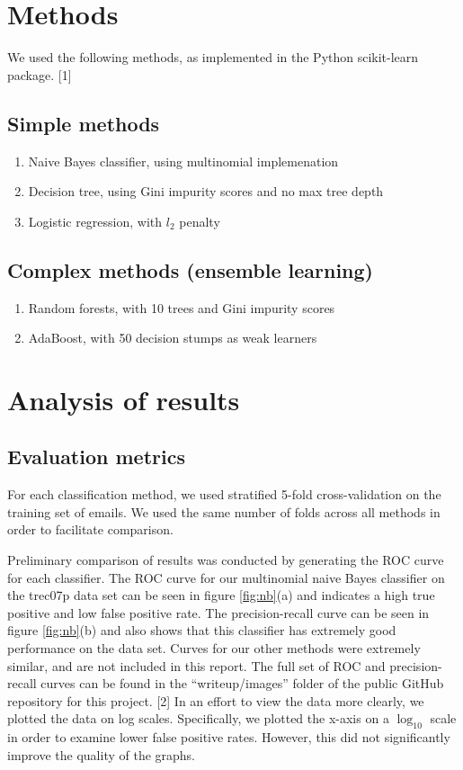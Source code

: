 \documentclass{article} %
\begin{document}
\section{Methods}
We used the following methods, as implemented in the Python scikit-learn package. [1]
\subsection{Simple methods}
\begin{enumerate}
  \item Naive Bayes classifier, using multinomial implemenation
  \item Decision tree, using Gini impurity scores and no max tree depth
  \item Logistic regression, with $l_2$ penalty
\end{enumerate}

\subsection{Complex methods (ensemble learning)}
\begin{enumerate}
  \item Random forests, with 10 trees and Gini impurity scores 
  \item AdaBoost, with 50 decision stumps as weak learners
\end{enumerate}

\section{Analysis of results}
\subsection{Evaluation metrics}
For each classification method, we used stratified 5-fold cross-validation on the training set of emails. We used the same number of folds across all methods in order to facilitate comparison.

Preliminary comparison of results was conducted by generating the ROC curve for each classifier. The ROC curve for our multinomial naive Bayes classifier on the trec07p data set can be seen in figure \ref{fig:nb}(a) and indicates a high true positive and low false positive rate. The precision-recall curve can be seen in figure \ref{fig:nb}(b) and also shows that this classifier has extremely good performance on the data set. Curves for our other methods were extremely similar, and are not included in this report. The full set of ROC and precision-recall curves can be found in the ``writeup/images'' folder of the public GitHub repository for this project. [2] In an effort to view the data more clearly, we plotted the data on log scales. Specifically, we plotted the x-axis on a $\log_{10}$ scale in order to examine lower false positive rates. However, this did not significantly improve the quality of the graphs.
\end{document}
